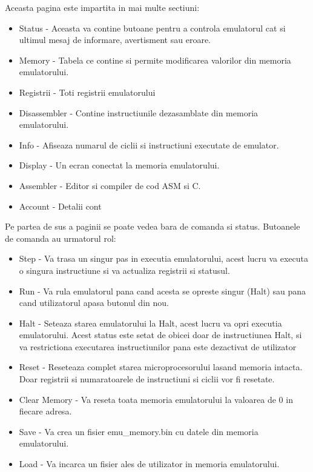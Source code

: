 \documentclass[titlepage,12pt]{article}
\DeclareRobustCommand{\code}[1]{{\ttfamily\small #1}}
\begin{document}
Aceasta pagina este impartita in mai multe sectiuni:
\begin{itemize}
\item {Status} - Aceasta va contine butoane pentru a controla emulatorul cat si ultimul mesaj de informare, avertisment sau eroare.
\item {Memory} - Tabela ce contine si permite modificarea valorilor din memoria emulatorului.
\item {Registrii} - Toti registrii emulatorului
\item {Disassembler} - Contine instructiunile dezasamblate din memoria emulatorului.
\item {Info} - Afiseaza numarul de ciclii si instructiuni executate de emulator.
\item {Display} - Un ecran conectat la memoria emulatorului.
\item {Assembler} - Editor si compiler de cod ASM si C.
\item {Account} - Detalii cont
\end{itemize}

Pe partea de sus a paginii se poate vedea bara de comanda si status. Butoanele de comanda au urmatorul rol:
\begin{itemize}
\item {\code{Step}} - Va trasa un singur pas in executia emulatorului, acest lucru va executa o singura instructiune si va actualiza registrii si statusul.
\item {\code{Run}} - Va rula emulatorul pana cand acesta se opreste singur (Halt) sau pana cand utilizatorul apasa butonul din nou.
\item {\code{Halt}} - Seteaza starea emulatorului la Halt, acest lucru va opri executia emulatorului. Acest status este setat de obicei doar de instructiunea Halt, si va restrictiona executarea instructiunilor pana este dezactivat de utilizator
\item {\code{Reset}} - Reseteaza complet starea microprocesorului lasand memoria intacta. Doar registrii si numaratoarele de instructiuni si ciclii vor fi resetate.
\item {\code{Clear Memory}} - Va reseta toata memoria emulatorului la valoarea de 0 in fiecare adresa.
\item {\code{Save}} - Va crea un fisier \code{emu\_memory.bin} cu datele din memoria emulatorului.
\item {\code{Load}} - Va incarca un fisier ales de utilizator in memoria emulatorului.
\end{itemize}
\end{document}
